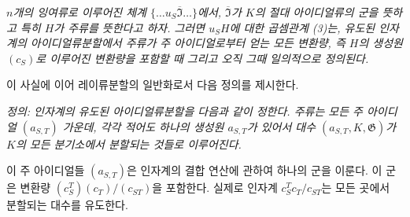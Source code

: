 \emph{\(n\)개의 잉여류로 이루어진 체계 \(\{\ldots u_S\overline{\mathfrak I}\ldots\}\)에서, \(\overline{\mathfrak I}\)가 \(K\)의 절대 아이디얼류의 군을 뜻하고 특히 \(H\)가 주류를 뜻한다고 하자. 그러면 \(u_SH\)에 대한 곱셈관계 (3)는, 유도된 인자계의 아이디얼류분할에서 주류가 주 아이디얼로부터 얻는 모든 변환량, 즉 \(H\)의 생성원 \((c_S)\)로 이루어진 변환량을 포함할 때 그리고 오직 그때 일의적으로 정의된다.}

이 사실에 이어 레이류분할의 일반화로서 다음 정의를 제시한다.

\emph{정의: 인자계의 유도된 아이디얼류분할을 다음과 같이 정한다. 주류는 모든 주 아이디얼 \((a_{S,T})\) 가운데, 각각 적어도 하나의 생성원 \(a_{S,T}\)가 있어서 대수 \((a_{S,T},K,\mathfrak G)\)가 \(K\)의 모든 분기소에서 분할되는 것들로 이루어진다.}

이 주 아이디얼들 \((a_{S,T})\)은 인자계의 결합 연산에 관하여 하나의 군을 이룬다. 이 군은 변환량 \((c_S^T)(c_T)/(c_{ST})\)을 포함한다. 실제로 인자계 \(c_S^Tc_T/c_{ST}\)는 모든 곳에서 분할되는 대수를 유도한다.
